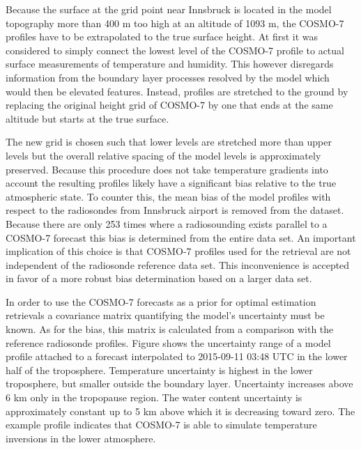         {}

    Because the surface at the grid point near Innsbruck is located in the model
    topography more than 400 m too high at an altitude of 1093 m, the COSMO-7
    profiles have to be extrapolated to the true surface height. At first it was
    considered to simply connect the lowest level of the COSMO-7 profile to
    actual surface measurements of temperature and humidity. This however
    disregards information from the boundary layer processes resolved by the
    model which would then be elevated features. Instead, profiles are
    stretched to the ground by replacing the original height grid of COSMO-7
    by one that ends at the same altitude but starts at the true surface.

    The new grid is chosen such that lower levels are stretched more than
    upper levels but the overall relative spacing of the model levels is
    approximately preserved. Because this procedure does not take temperature
    gradients into account the resulting profiles likely have a significant
    bias relative to the true atmospheric state. To counter this, the mean
    bias of the model profiles with respect to the radiosondes from Innsbruck
    airport is removed from the dataset. Because there are only 253 times
    where a radiosounding exists parallel to a COSMO-7 forecast this bias is
    determined from the entire data set. An important implication of this
    choice is that COSMO-7 profiles used for the retrieval are not independent
    of the radiosonde reference data set. This inconvenience is accepted in
    favor of a more robust bias determination based on a larger data set.

    In order to use the COSMO-7 forecasts as a prior for optimal estimation
    retrievals a covariance matrix quantifying the model's uncertainty must
    be known. As for the bias, this matrix is calculated from a comparison
    with the reference radiosonde profiles. Figure 
    shows the uncertainty range of a model profile attached to a forecast
    interpolated to 2015-09-11 03:48 UTC in the lower half of the troposphere.
    Temperature uncertainty is highest in the lower troposphere, but smaller
    outside the boundary layer. Uncertainty increases above 6 km only in the
    tropopause region. The water content uncertainty is approximately constant
    up to 5 km above which it is decreasing toward zero. The example profile
    indicates that COSMO-7 is able to simulate temperature inversions in the
    lower atmosphere.

